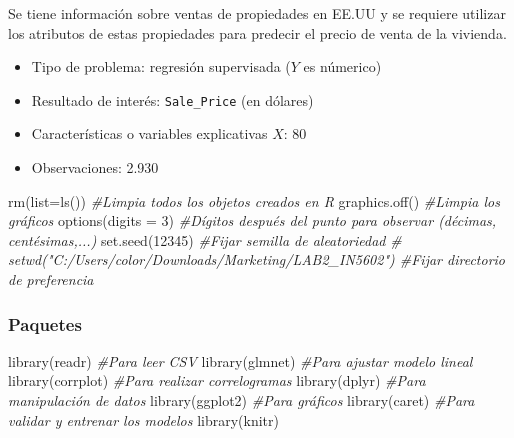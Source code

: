 \documentclass[
]{article}
\newenvironment{Shaded}{\begin{snugshade}}{\end{snugshade}}
\newcommand{\AttributeTok}[1]{\textcolor[rgb]{0.77,0.63,0.00}{#1}}
\newcommand{\CommentTok}[1]{\textcolor[rgb]{0.56,0.35,0.01}{\textit{#1}}}
\newcommand{\DecValTok}[1]{\textcolor[rgb]{0.00,0.00,0.81}{#1}}
\newcommand{\FunctionTok}[1]{\textcolor[rgb]{0.00,0.00,0.00}{#1}}
\newcommand{\NormalTok}[1]{#1}
\providecommand{\tightlist}{%
  \setlength{\itemsep}{0pt}\setlength{\parskip}{0pt}}
\begin{document}
Se tiene información sobre ventas de propiedades en EE.UU y se requiere
utilizar los atributos de estas propiedades para predecir el precio de
venta de la vivienda.

\begin{itemize}
\tightlist
\item
  Tipo de problema: regresión supervisada (\(Y\) es númerico)
\item
  Resultado de interés: \texttt{Sale\_Price} (en dólares)
\item
  Características o variables explicativas \(X\): 80
\item
  Observaciones: 2.930
\end{itemize}

\begin{Shaded}
\begin{Highlighting}[]
\FunctionTok{rm}\NormalTok{(}\AttributeTok{list=}\FunctionTok{ls}\NormalTok{())                }\CommentTok{\#Limpia todos los objetos creados en R}
\FunctionTok{graphics.off}\NormalTok{()           }\CommentTok{\#Limpia los gráficos}
\FunctionTok{options}\NormalTok{(}\AttributeTok{digits =} \DecValTok{3}\NormalTok{)  }\CommentTok{\#Dígitos después del punto para observar (décimas, centésimas,...)}
\FunctionTok{set.seed}\NormalTok{(}\DecValTok{12345}\NormalTok{)      }\CommentTok{\#Fijar semilla de aleatoriedad}
\CommentTok{\# setwd("C:/Users/color/Downloads/Marketing/LAB2\_IN5602") \#Fijar directorio de preferencia}
\end{Highlighting}
\end{Shaded}

\hypertarget{paquetes}{%
\subsubsection{Paquetes}\label{paquetes}}

\begin{Shaded}
\begin{Highlighting}[]
\FunctionTok{library}\NormalTok{(readr)     }\CommentTok{\#Para leer CSV}
\FunctionTok{library}\NormalTok{(glmnet)    }\CommentTok{\#Para ajustar modelo lineal}
\FunctionTok{library}\NormalTok{(corrplot)  }\CommentTok{\#Para realizar correlogramas}
\FunctionTok{library}\NormalTok{(dplyr)     }\CommentTok{\#Para manipulación de datos}
\FunctionTok{library}\NormalTok{(ggplot2)   }\CommentTok{\#Para gráficos}
\FunctionTok{library}\NormalTok{(caret)     }\CommentTok{\#Para validar y entrenar los modelos}
\FunctionTok{library}\NormalTok{(knitr) }
\end{Highlighting}
\end{Shaded}
\end{document}
